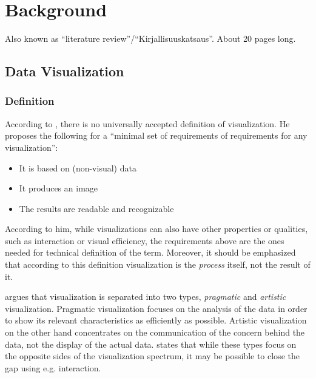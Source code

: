 
\chapter{Background}
\label{chapter:background} 

Also known as ``literature review''/``Kirjallisuuskatsaus''. About 20 pages long.


\section{Data Visualization}

\subsection{Definition}

According to \citet[chap. ~3]{kosara_visualization_2007}, there is no universally accepted definition of visualization. He proposes the following for a ``minimal set of requirements of requirements for any visualization'':

\begin{itemize}
	\item It is based on (non-visual) data
	\item It produces an image
	\item The results are readable and recognizable
\end{itemize}

According to him, while visualizations can also have other properties or qualities, such as interaction or visual efficiency, the requirements above are the ones needed for technical definition of the term. Moreover, it should be emphasized that according to this definition visualization is the \emph{process} itself, not the result of it.

\citet[chap. ~4]{kosara_visualization_2007} argues that visualization is separated into two types, \emph{pragmatic} and \emph{artistic} visualization. Pragmatic visualization focuses on the analysis of the data in order to show its relevant characteristics as efficiently as possible. Artistic visualization on the other hand concentrates on the communication of the concern behind the data, not the display of the actual data. \citeauthor{kosara_visualization_2007} states that while these types focus on the opposite sides of the visualization spectrum, it may be possible to close the gap using e.g. interaction.

